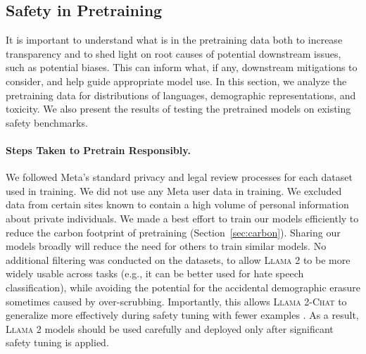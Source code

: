 \subsection{Safety in Pretraining}
\label{sec:safety_data}
It is important to understand what is in the pretraining data both to increase transparency and to shed light on root causes of potential downstream issues, such as potential biases. This can inform what, if any, downstream mitigations to consider, and help guide appropriate model use. In this section, we analyze the pretraining data for distributions of languages, demographic representations, and toxicity. We also present the results of testing the pretrained models on existing safety benchmarks.

\paragraph{Steps Taken to Pretrain Responsibly.} We followed Meta's standard privacy and legal review processes for each dataset used in training. We did not use any Meta user data in training. We excluded data from certain sites known to contain a high volume of personal information about private individuals. We made a best effort to train our models efficiently to reduce the carbon footprint of pretraining (Section~\ref{sec:carbon}). Sharing our models broadly will reduce the need for others to train similar models. No additional filtering was conducted on the datasets, to allow \textsc{Llama 2} to be more widely usable across tasks (e.g., it can be better used for hate speech classification), while avoiding the potential for the accidental demographic erasure sometimes caused by over-scrubbing. Importantly, this allows \textsc{Llama 2-Chat} to generalize more effectively during safety tuning with fewer examples \citep{welbl2021challenges, korbak2023pretraining, xu2021recipes}. As a result, \textsc{Llama 2} models should be used carefully and deployed only after significant safety tuning is applied.

